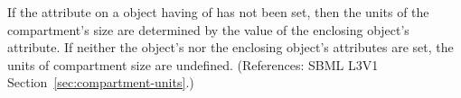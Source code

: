 If the  attribute on a \Compartment object having
 of  has not been set, then the units of
the compartment's size are determined by the value of the enclosing \Model
object's  attribute.  If neither the \Compartment object's
 nor the enclosing \Model object's 
attributes are set, the units of compartment size are undefined.
(References: SBML L3V1 Section~\ref{sec:compartment-units}.)

